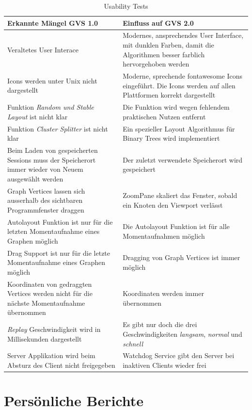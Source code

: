 \documentclass[11pt,a4paper,english,oneside]{book}
\numberwithin{equation}{chapter}
\begin{document}
	\begin{table}[h!]
		\centering
		\begin{tabularx}{\linewidth}{X X }
			\toprule 
			Erkannte Mängel GVS 1.0 & Einfluss auf GVS 2.0\\
			\midrule
			Veraltetes User Interace & Modernes, ansprechendes User Interface, mit dunklen Farben, damit die Algorithmen besser farblich hervorgehoben werden \\
			Icons werden unter Unix nicht dargestellt & Moderne, sprechende \gls{fontawesome} Icons eingeführt. Die Icons werden auf allen Plattformen korrekt dargestellt \\
			Funktion \textit{Random und Stable Layout} ist nicht klar & Die Funktion wird wegen fehlendem praktischen Nutzen entfernt \\
			Funktion \textit{Cluster Splitter} ist nicht klar & Ein spezieller Layout Algorithmus für Binary Trees wird implementiert \\
			Beim Laden von gespeicherten Sessions muss der Speicherort immer wieder von Neuem ausgewählt werden & Der zuletzt verwendete Speicherort wird gespeichert \\
			Graph Vertices lassen sich ausserhalb des sichtbaren Programmfenster draggen & ZoomPane skaliert das Fenster, sobald ein Knoten den Viewport verlässt \\
			Autolayout Funktion ist nur für die letzten Momentaufnahme eines Graphen möglich & Die Autolayout Funktion ist für alle Momentaufnahmen möglich \\
			Drag Support ist nur für die letzte Momentaufnahme eines Graphen möglich & Dragging von Graph Vertices ist immer möglich \\
			Koordinaten von gedraggten Vertices werden nicht für die nächste Momentaufnahme übernommen & Koordinaten werden immer übernommen \\
			\textit{Replay} Geschwindigkeit wird in Millisekunden dargestellt & Es gibt nur doch die drei Geschwindigkeiten \textit{langsam}, \textit{normal} und \textit{schnell} \\
			Server Applikation wird beim Absturz des Client nicht freigegeben & Watchdog Service gibt den Server bei inaktiven Clients wieder frei \\
			\bottomrule 
		\end{tabularx} 
		\caption{Usability Tests} 
	\end{table}
	
	\chapter{Persönliche Berichte}
	\label{erfahrungsberichte}
\end{document}
